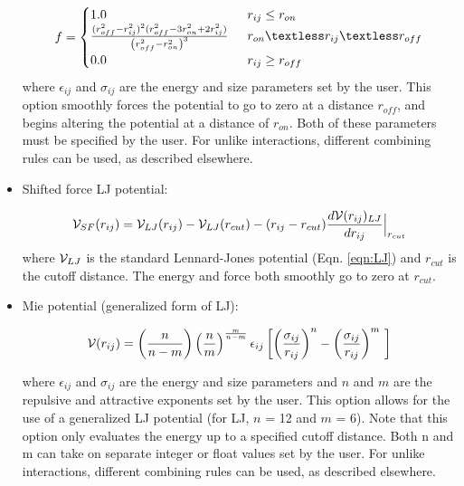 \begin{itemize}
\begin{eqnarray}
	f = 
	\begin{cases}
	
		1.0 \, \, \, &  r_ {ij}  \le r_{on} \\
		\frac { (r_{off}^2 - r_{ij}^2)^2 (r_{off}^2 - 3r_{on}^2 + 2r_{ij}^2)} {\left ( r_{off}^2 - r_{on}^2 \right )^3}  \, \, \,  & r_{on} \textless r_{ij} \textless r_{off}\\
		0.0 \, \, \, & r_{ij} \ge r_{off} 
		
	\end{cases}
\end{eqnarray}
where $\epsilon_{ij}$ and $\sigma_{ij}$ are the energy and size
parameters set by the user. This option smoothly forces the potential
to go to zero at a distance $r_{off}$, and begins altering the
potential at a distance of $r_{on}$. Both of these parameters must be
specified by the user. For unlike interactions, different 
combining rules can be used, as described elsewhere.


\item Shifted force LJ potential:

\begin{equation}
    {\cal V}_{SF}(r_{ij})= {\cal V}_{LJ}(r_{ij}) - {\cal V}_{LJ}(r_{cut}) - (r_{ij} - r_{cut}) \frac{d {\cal V}(r_{ij})_{LJ}}{d r_{ij}} \Bigr|_{r_{cut}}
 \label{Eq:shift-force}
\end{equation}
where ${\cal V}_{LJ}$ is the standard Lennard-Jones potential (Eqn. \ref{eqn:LJ}) and $r_{cut}$ is the cutoff distance.
The energy and force both smoothly go to zero at $r_{cut}$.


\item Mie potential (generalized form of LJ):

\begin{equation}
 {\cal V}(r_{ij})=  \left ( \frac{n}{n-m} \right ) \left ( \frac {n}{m} \right )^{\frac{m}{n-m}}\epsilon_{ij} \left [  \left ( \frac {\sigma_{ij}} { r_{ij} }\right )^{n} - \left ( \frac {\sigma_{ij}} { r_{ij} }\right )^{m}\ \right  ] 
 \label{Eq:mie}
\end{equation}



where $\epsilon_{ij}$ and $\sigma_{ij}$ are the energy and size
parameters and $n$ and $m$ are the repulsive and attractive exponents set by the user. This option allows for the use of a generalized LJ potential (for LJ, $n$ = 12 and $m$ = 6).  Note that this
option only evaluates the energy up to a specified cutoff
distance. Both n and m can take on separate integer or float values set by the user. For unlike interactions, different 
combining rules can be used, as described elsewhere.


\end{itemize}
